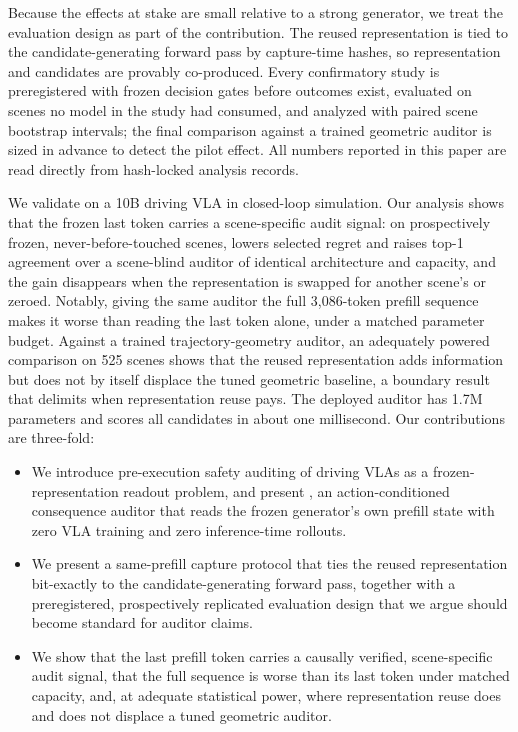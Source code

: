Because the effects at stake are small relative to a strong generator, we treat the evaluation design as part of the contribution.
The reused representation is tied to the candidate-generating forward pass by capture-time hashes, so representation and candidates are provably co-produced.
Every confirmatory study is preregistered with frozen decision gates before outcomes exist, evaluated on scenes no model in the study had consumed, and analyzed with paired scene bootstrap intervals; the final comparison against a trained geometric auditor is sized in advance to detect the pilot effect.
All numbers reported in this paper are read directly from hash-locked analysis records.

We validate \headname{} on a 10B driving VLA in closed-loop simulation.
Our analysis shows that the frozen last token carries a scene-specific audit signal: on prospectively frozen, never-before-touched scenes, \headname{} lowers selected regret and raises top-1 agreement over a scene-blind auditor of identical architecture and capacity, and the gain disappears when the representation is swapped for another scene's or zeroed.
Notably, giving the same auditor the full 3{,}086-token prefill sequence makes it worse than reading the last token alone, under a matched parameter budget.
Against a trained trajectory-geometry auditor, an adequately powered comparison on 525 scenes shows that the reused representation adds information but does not by itself displace the tuned geometric baseline, a boundary result that delimits when representation reuse pays.
The deployed auditor has 1.7M parameters and scores all candidates in about one millisecond.
Our contributions are three-fold:
\begin{itemize}
  \item We introduce pre-execution safety auditing of driving VLAs as a frozen-representation readout problem, and present \headname{}, an action-conditioned consequence auditor that reads the frozen generator's own prefill state with zero VLA training and zero inference-time rollouts.
  \item We present a same-prefill capture protocol that ties the reused representation bit-exactly to the candidate-generating forward pass, together with a preregistered, prospectively replicated evaluation design that we argue should become standard for auditor claims.
  \item We show that the last prefill token carries a causally verified, scene-specific audit signal, that the full sequence is worse than its last token under matched capacity, and, at adequate statistical power, where representation reuse does and does not displace a tuned geometric auditor.
\end{itemize}
